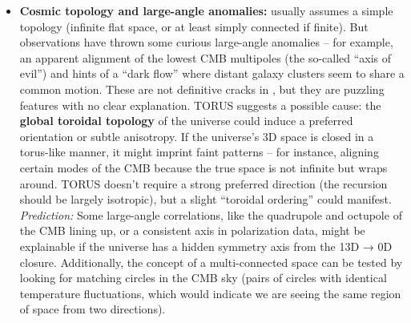 \documentclass[
]{article}
\begin{document}
{\begin{itemize}
  of distant quasars (for \alpha variation) and comparisons of atomic clocks
  over years (for any temporal drift in constants) -- will test
  this\hspace{0pt}. A confirmed spatial or temporal variation of a
  constant, especially if it correlates with large-scale cosmic
  features, would be revolutionary and strongly favor a theory like
  TORUS that integrates such variation into its structure. In contrast,
  \LambdaCDM (and standard particle physics) would struggle to explain
  correlated constant variations without introducing new fields or
  clunky mechanisms. TORUS offers a ready-made explanation: the
  recursion fields at 12D/13D subtly influencing 4D physics\hspace{0pt}.
  This is a deviation to watch for. Even a null result (no variation) is
  informative: TORUS would then imply that the recursion coupling is
  extremely small or symmetrically distributed, reaffirming the
  constancy to high precision.
\item
  \textbf{Cosmic topology and large-angle anomalies:} \LambdaCDM usually
  assumes a simple topology (infinite flat space, or at least simply
  connected if finite). But observations have thrown some curious
  large-angle anomalies -- for example, an apparent alignment of the
  lowest CMB multipoles (the so-called ``axis of evil'') and hints of a
  ``dark flow'' where distant galaxy clusters seem to share a common
  motion. These are not definitive cracks in \LambdaCDM, but they are puzzling
  features with no clear explanation. TORUS suggests a possible cause:
  the \textbf{global toroidal topology} of the universe could induce a
  preferred orientation or subtle anisotropy. If the universe's 3D space
  is closed in a torus-like manner, it might imprint faint patterns --
  for instance, aligning certain modes of the CMB because the true space
  is not infinite but wraps around. TORUS doesn't require a strong
  preferred direction (the recursion should be largely isotropic), but a
  slight ``toroidal ordering'' could manifest. \emph{Prediction:} Some
  large-angle correlations, like the quadrupole and octupole of the CMB
  lining up, or a consistent axis in polarization data, might be
  explainable if the universe has a hidden symmetry axis from the 13D →
  0D closure\hspace{0pt}. Additionally, the concept of a multi-connected
  space can be tested by looking for matching circles in the CMB sky
  (pairs of circles with identical temperature fluctuations, which would
  indicate we are seeing the same region of space from two directions).

\end{itemize}}
\end{document}
